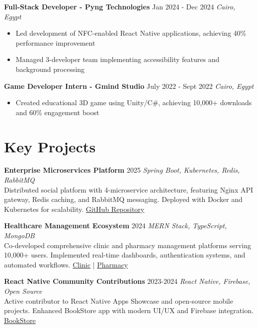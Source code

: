 \documentclass[8pt,a4paper]{article}
\newcommand{\cventry}[4]{%
    \textbf{#1} \hfill {\small\color{secondarycolor} #2} \hfill {\footnotesize\textit{#3}}\\
    #4
    \vspace{0.02em}
}
\begin{document}
\cventry{Full-Stack Developer - Pyng Technologies}{Jan 2024 - Dec 2024}{Cairo, Egypt}{
\begin{itemize}
    \item Led development of NFC-enabled React Native applications, achieving 40\% performance improvement
    \item Managed 3-developer team implementing accessibility features and background processing
\end{itemize}
}

\cventry{Game Developer Intern - Gmind Studio}{July 2022 - Sept 2022}{Cairo, Egypt}{
\begin{itemize}
    \item Created educational 3D game using Unity/C\#, achieving 10,000+ downloads and 60\% engagement boost
\end{itemize}
}


\section{Key Projects}


\cventry{Enterprise Microservices Platform}{2025}{Spring Boot, Kubernetes, Redis, RabbitMQ}{
Distributed social platform with 4-microservice architecture, featuring Nginx API gateway, Redis caching, and RabbitMQ messaging. Deployed with Docker and Kubernetes for scalability. \href{https://github.com/mariamhmostafa/FinalProject-29-Cache_Me_If_You_Can}{GitHub Repository}
}

\cventry{Healthcare Management Ecosystem}{2024}{MERN Stack, TypeScript, MongoDB}{
Co-developed comprehensive clinic and pharmacy management platforms serving 10,000+ users. Implemented real-time dashboards, authentication systems, and automated workflows. \href{https://github.com/advanced-computer-lab-2023/Copilot-and-Sons-Clinic}{Clinic} | \href{https://github.com/advanced-computer-lab-2023/Copilot-and-Sons-Pharmacy}{Pharmacy}
}

\cventry{React Native Community Contributions}{2023-2024}{React Native, Firebase, Open Source}{
Active contributor to React Native Apps Showcase and open-source mobile projects. Enhanced BookStore app with modern UI/UX and Firebase integration.  \href{https://github.com/ramezlahzy/BookStore}{BookStore}
}
\end{document}
